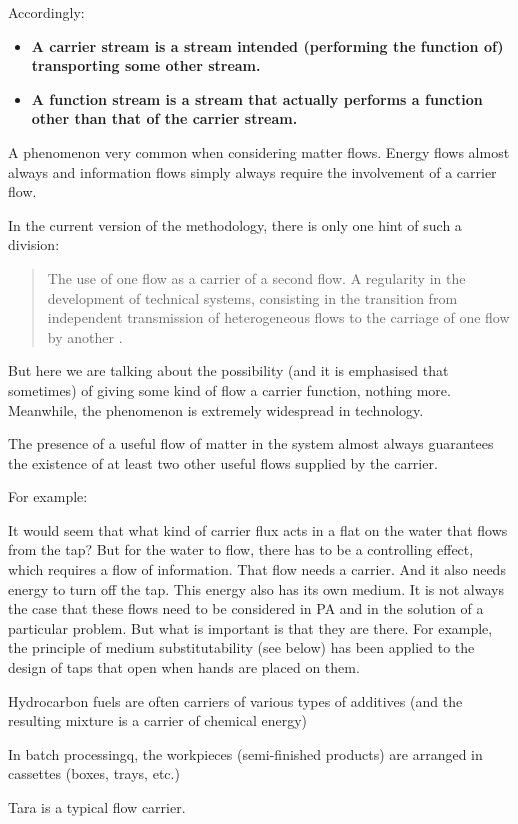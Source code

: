 \documentclass[a4paper,11pt]{article}
\begin{document}
Accordingly:
\begin{itemize}
\item \textbf{A carrier stream is a stream intended (performing the function
  of) transporting some other stream.}
\item \textbf{A function stream is a stream that actually performs a function
  other than that of the carrier stream.}
\end{itemize}
A phenomenon very common when considering matter flows. Energy flows almost
always and information flows simply always require the involvement of a
carrier flow.

In the current version of the methodology, there is only one hint of such a
division:
\begin{quote}
  The use of one flow as a carrier of a second flow. A regularity in the
  development of technical systems, consisting in the transition from
  independent transmission of heterogeneous flows to the carriage of one flow
  by another \cite{B6}.
\end{quote}

But here we are talking about the possibility (and it is emphasised that
sometimes) of giving some kind of flow a carrier function, nothing more.
Meanwhile, the phenomenon is extremely widespread in technology.

The presence of a useful flow of matter in the system almost always guarantees
the existence of at least two other useful flows supplied by the carrier.

For example:

It would seem that what kind of carrier flux acts in a flat on the water that
flows from the tap? But for the water to flow, there has to be a controlling
effect, which requires a flow of information. That flow needs a carrier. And
it also needs energy to turn off the tap. This energy also has its own medium.
It is not always the case that these flows need to be considered in PA and in
the solution of a particular problem. But what is important is that they are
there. For example, the principle of medium substitutability (see below) has
been applied to the design of taps that open when hands are placed on them.

Hydrocarbon fuels are often carriers of various types of additives (and the
resulting mixture is a carrier of chemical energy)

In batch processingq, the workpieces (semi-finished products) are arranged in cassettes (boxes, trays, etc.)

Tara is a typical flow carrier.
\end{document}
